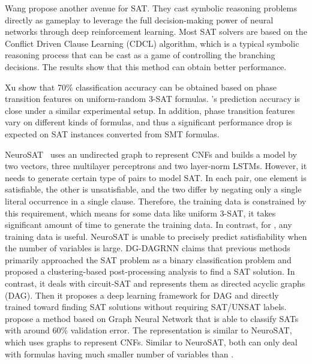 Wang \etal \cite{wang2018gameplay} propose another avenue for SAT. They cast
symbolic reasoning problems directly as gameplay to leverage the full
decision-making power of neural networks through deep reinforcement
learning.  Most SAT solvers are based on the Conflict Driven Clause
Learning (CDCL) algorithm, which is a typical symbolic reasoning
process that can be cast as a game of controlling the branching
decisions.  The results show that this method can obtain better
performance.

Xu \etal \cite{xu2012predicting} show that 70\% classification
  accuracy can be obtained based on phase transition features on
  uniform-random 3-SAT formulas. \tool's prediction accuracy is
close under a similar experimental setup. In
  addition, phase transition features vary on different kinds of
  formulas, and thus a significant performance drop is expected on SAT
  instances converted from SMT formulas.

NeuroSAT~\citep{selsam2018learning} uses an undirected graph to
represent CNFs and builds a model by two vectors, three multilayer
perceptrons and two layer-norm LSTMs.  However, it needs to generate
certain type of pairs to model SAT. In each pair, one element is
satisfiable, the other is unsatisfiable, and the two differ by
negating only a single literal occurrence in a single clause.
Therefore, the training data is constrained by this requirement, which
means for some data like uniform 3-SAT, it takes significant amount
of time to generate the training data. In contrast, for \tool, any
training data is useful.  NeuroSAT is unable to precisely predict
satisfiability when the number of variables is large.
DG-DAGRNN \cite{amizadeh2018learning} claims that previous methods 
primarily approached the SAT problem as a binary classification 
problem and proposed a clustering-based post-processing analysis 
to find a SAT solution.
In contrast, it deals with circuit-SAT and represents them as 
directed acyclic graphs (DAG). 
Then it proposes a deep learning framework for DAG
and directly trained toward finding SAT 
solutions without requiring SAT/UNSAT labels.
\citet{bunz2017graph} propose a method based on Graph Neural Network
that is able to classify SATs with around 60\% validation error. The
representation is similar to NeuroSAT, which uses graphs to represent
CNFs. Similar to NeuroSAT, both can only deal with formulas having 
much smaller number of variables than \tool.

